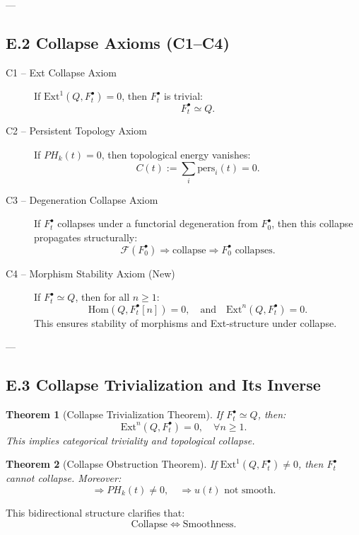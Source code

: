 \documentclass[11pt]{article}
\newtheorem{theorem}{Theorem}[section]
\begin{document}
---

\subsection*{E.2 Collapse Axioms (C1–C4)}

\begin{description}
  \item[C1 – Ext Collapse Axiom]  
  If $\mathrm{Ext}^1(Q, F^\bullet_t) = 0$, then $F^\bullet_t$ is trivial:
  \[
  F^\bullet_t \simeq Q.
  \]

  \item[C2 – Persistent Topology Axiom]  
  If $PH_k(t) = 0$, then topological energy vanishes:
  \[
  C(t) := \sum_i \text{pers}_i(t) = 0.
  \]

  \item[C3 – Degeneration Collapse Axiom]  
  If $F^\bullet_t$ collapses under a functorial degeneration from $F^\bullet_0$,  
  then this collapse propagates structurally:
  \[
  \mathcal{F}(F^\bullet_0) \Rightarrow \text{collapse} \Rightarrow F^\bullet_0 \text{ collapses.}
  \]

  \item[C4 – Morphism Stability Axiom (New)]  
  If $F^\bullet_t \simeq Q$, then for all $n \geq 1$:
  \[
  \mathrm{Hom}(Q, F^\bullet_t[n]) = 0,
  \quad \text{and} \quad
  \mathrm{Ext}^n(Q, F^\bullet_t) = 0.
  \]
  This ensures stability of morphisms and Ext-structure under collapse.
\end{description}

---

\subsection*{E.3 Collapse Trivialization and Its Inverse}

\begin{theorem}[Collapse Trivialization Theorem]
If $F^\bullet_t \simeq Q$, then:
\[
\mathrm{Ext}^n(Q, F^\bullet_t) = 0, \quad \forall n \geq 1.
\]
This implies categorical triviality and topological collapse.
\end{theorem}

\begin{theorem}[Collapse Obstruction Theorem]
If $\mathrm{Ext}^1(Q, F^\bullet_t) \neq 0$, then $F^\bullet_t$ cannot collapse.  
Moreover:
\[
\Rightarrow PH_k(t) \neq 0, \quad \Rightarrow u(t) \text{ not smooth}.
\]
\end{theorem}

This bidirectional structure clarifies that:
\[
\text{Collapse} \Leftrightarrow \text{Smoothness}.
\]
\end{document}
